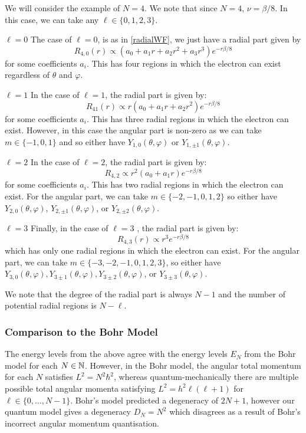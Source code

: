 \documentclass[../main.tex]{subfiles}
\begin{document}
\begin{example}
  We will consider the example of $N = 4$.
  We note that since $N = 4$, $\nu = \beta/8$.
  In this case, we can take any $\ell \in \{0, 1, 2, 3\}$.
  \begin{proofcases}
    \begin{case}{$\ell = 0$}
      The case of $\ell = 0$, is as in \cref{radialWF}, we just have a radial part given by
      \[
        R_{4, 0}(r) \propto (a_0 + a_1 r + a_2 r^2 + a_3 r^3) e^{-r\beta/8}
      \]
      for some coefficients $a_i$.
      This has four regions in which the electron can exist regardless of $\theta$ and $\varphi$.
    \end{case}
    \begin{case}{$\ell = 1$}
      In the case of $\ell = 1$, the radial part is given by:
      \[
        R_{4 1}(r) \propto r(a_0 + a_1 r + a_2 r^2) e^{-r\beta/8}
      \]
      for some coefficients $a_i$.
      This has three radial regions in which the electron can exist.
      However, in this case the angular part is non-zero as we can take $m \in \{-1, 0, 1\}$ and so either have $Y_{1, 0}(\theta, \varphi)$ or $Y_{1, \pm 1}(\theta, \varphi)$.
    \end{case}
    \begin{case}{$\ell = 2$}
      In the case of $\ell = 2$, the radial part is given by:
      \[
        R_{4, 2} \propto r^2(a_0 + a_1 r) e^{-r\beta/8}
      \]
      for some coefficients $a_i$.
      This has two radial regions in which the electron can exist.
      For the angular part, we can take $m \in \{-2, -1, 0, 1, 2\}$ so either have $Y_{2, 0}(\theta, \varphi)$, $Y_{2, \pm1}(\theta, \varphi)$, or $Y_{2, \pm2}(\theta, \varphi)$.
    \end{case}
    \begin{case}{$\ell = 3$}
      Finally, in the case of $\ell = 3$ , the radial part is given by:
      \[
        R_{4, 3}(r) \propto r^3 e^{-r\beta/8}
      \]
      which has only one radial regions in which the electron can exist.
      For the angular part, we can take $m \in \{-3, -2, -1, 0, 1, 2, 3\}$, so either have $Y_{3, 0}(\theta, \varphi), Y_{3 \pm1}(\theta, \varphi), Y_{3 \pm2}(\theta, \varphi)$, or $Y_{3 \pm3}(\theta, \varphi)$.
    \end{case}
  \end{proofcases}
  We note that the degree of the radial part is always $N - 1$ and the number of potential radial regions is $N - \ell$.
\end{example}
\subsubsection{Comparison to the Bohr Model}
The energy levels from the above agree with the energy levels $E_N$ from the Bohr model for each $N \in \mathbb{N}$.
However, in the Bohr model, the angular total momentum for each $N$ satisfies $L^2 = N^2 \hbar^2$, whereas quantum-mechanically there are multiple possible total angular momenta satisfying $L^2 = h^2 \ell(\ell + 1)$ for $\ell \in \{0, \ldots, N - 1\}$.
Bohr's model predicted a degeneracy of $2N + 1$, however our quantum model gives a degeneracy $D_N = N^2$ which disagrees as a result of Bohr's incorrect angular momentum quantisation.
\end{document}
